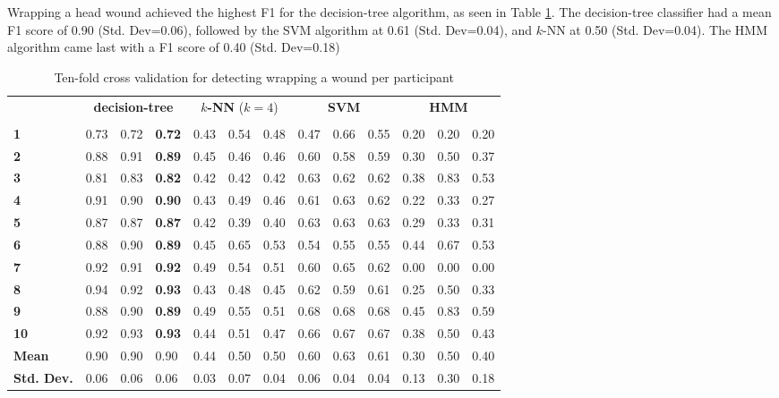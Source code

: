 \par Wrapping a head wound achieved the highest F1 for the decision-tree algorithm, as seen in Table \ref{tab:w:ml}. The decision-tree classifier had a mean F1 score of 0.90 (Std. Dev=0.06), followed by the SVM algorithm at 0.61 (Std. Dev=0.04), and $k$-NN at 0.50 (Std. Dev=0.04). The HMM algorithm came last with a F1 score of 0.40 (Std. Dev=0.18)
\begin{table}[]
	\centering
	\begin{tabular}{lllllllllllll}
		\multirow{2}{*}{\rotatebox[origin=c]{45}{\textbf{Participant}}} & \multicolumn{3}{c}{\textbf{decision-tree}} & \multicolumn{3}{c}{\textbf{$k$-NN} ($k=4$)} & \multicolumn{3}{c}{\textbf{SVM}} & \multicolumn{3}{c}{\textbf{HMM}} \\
		& \rot{Precision}     & \rot{Recall}    & \rot{F1}    & \rot{Precision}     & \rot{Recall}    & \rot{F1}  & \rot{Precision}     & \rot{Recall}    & \rot{F1} & \rot{Precision}     & \rot{Recall}    & \rot{F1} \\
		\textbf{1}   & 0.73 & 0.72 & \textbf{0.72} & 0.43 & 0.54 & 0.48 & 0.47 & 0.66 & 0.55 & 0.20 & 0.20 & 0.20 \\
		\textbf{2}   & 0.88 & 0.91 & \textbf{0.89} & 0.45 & 0.46 & 0.46 & 0.60 & 0.58 & 0.59 & 0.30 & 0.50 & 0.37 \\
		\textbf{3}   & 0.81 & 0.83 & \textbf{0.82} & 0.42 & 0.42 & 0.42 & 0.63 & 0.62 & 0.62 & 0.38 & 0.83 & 0.53 \\
		\textbf{4}   & 0.91 & 0.90 & \textbf{0.90} & 0.43 & 0.49 & 0.46 & 0.61 & 0.63 & 0.62 & 0.22 & 0.33 & 0.27 \\
		\textbf{5}   & 0.87 & 0.87 & \textbf{0.87} & 0.42 & 0.39 & 0.40 & 0.63 & 0.63 & 0.63 & 0.29 & 0.33 & 0.31 \\
		\textbf{6}   & 0.88 & 0.90 & \textbf{0.89} & 0.45 & 0.65 & 0.53 & 0.54 & 0.55 & 0.55 & 0.44 & 0.67 & 0.53 \\
		\textbf{7}   & 0.92 & 0.91 & \textbf{0.92} & 0.49 & 0.54 & 0.51 & 0.60 & 0.65 & 0.62 & 0.00 & 0.00 & 0.00 \\
		\textbf{8}   & 0.94 & 0.92 & \textbf{0.93} & 0.43 & 0.48 & 0.45 & 0.62 & 0.59 & 0.61 & 0.25 & 0.50 & 0.33 \\
		\textbf{9}   & 0.88 & 0.90 & \textbf{0.89} & 0.49 & 0.55 & 0.51 & 0.68 & 0.68 & 0.68 & 0.45 & 0.83 & 0.59 \\
		\textbf{10} & 0.92 & 0.93 & \textbf{0.93} & 0.44 & 0.51 & 0.47 & 0.66 & 0.67 & 0.67 & 0.38 & 0.50 & 0.43 \\
		\hline
		\textbf{Mean} & 0.90 & 0.90 & 0.90 & 0.44 & 0.50 & 0.50 & 0.60 & 0.63 & 0.61 & 0.30 & 0.50 & 0.40 \\
		\textbf{Std. Dev.} & 0.06 & 0.06 & 0.06 & 0.03 & 0.07 & 0.04 & 0.06 & 0.04 & 0.04 & 0.13 & 0.30 & 0.18
	\end{tabular}
	\caption{Ten-fold cross validation for detecting wrapping a wound per participant}
	\label{tab:w:ml}
\end{table}

